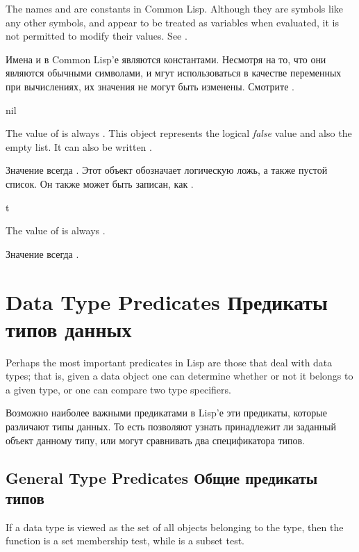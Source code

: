 The names  and  are constants in Common Lisp.  Although they
are symbols like any other symbols, and appear to be treated
as variables when evaluated, it is not permitted to modify their
values.  See .

Имена  и  в Common Lisp'е являются константами. Несмотря на то,
что они являются обычными символами, и мгут использоваться в качестве переменных
при вычислениях, их значения не могут быть изменены. Смотрите .

\begin{defun}[Constant]
nil

The value of {\nil} is always {\nil}.  This object represents the logical
\emph{false} value and also the empty list.  It can also be written \cd{()}.

Значение {\nil} всегда {\nil}. Этот объект обозначает логическую ложь, а также
пустой список. Он также может быть записан, как \cd{()}.
\end{defun}

\begin{defun}[Constant]
t

The value of  is always .

Значение  всегда .
\end{defun}

\section{Data Type Predicates Предикаты типов данных}

Perhaps the most important predicates in Lisp are those that deal
with data types;  that is, given a data object one can determine whether
or not it belongs to a given type, or one can compare two type specifiers.

Возможно наиболее важными предикатами в Lisp'е эти предикаты, которые различают
типы данных. То есть позволяют узнать принадлежит ли заданный объект данному 
типу, или могут сравнивать два спецификатора типов.

\subsection{General Type Predicates Общие предикаты типов}

If a data type is viewed as the set of all objects belonging to the type,
then the  function is a set membership test, while 
is a subset test.

